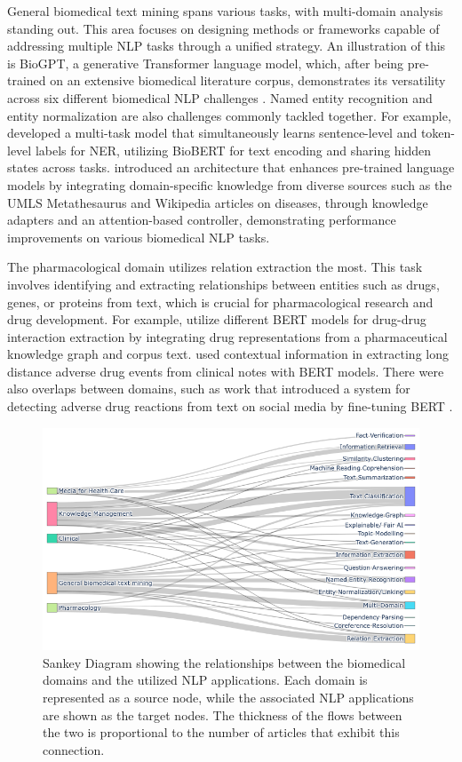 \documentclass[fleqn,10pt]{olplainarticle}
\begin{document}
General biomedical text mining spans various tasks, with multi-domain analysis standing out. This area focuses on designing methods or frameworks capable of addressing multiple NLP tasks through a unified strategy. An illustration of this is BioGPT, a generative Transformer language model, which, after being pre-trained on an extensive biomedical literature corpus, demonstrates its versatility across six different biomedical NLP challenges \citep{luo2022biogpt}. Named entity recognition and entity normalization are also challenges commonly tackled together. For example, \citep{tong2021multi} developed a multi-task model that simultaneously learns sentence-level and token-level labels for NER, utilizing BioBERT for text encoding and sharing hidden states across tasks. \cite{lu2021parameter} introduced an architecture that enhances pre-trained language models by integrating domain-specific knowledge from diverse sources such as the UMLS Metathesaurus and Wikipedia articles on diseases, through knowledge adapters and an attention-based controller, demonstrating performance improvements on various biomedical NLP tasks.

The pharmacological domain utilizes relation extraction the most. This task involves identifying and extracting relationships between entities such as drugs, genes, or proteins from text, which is crucial for pharmacological research and drug development. For example, \cite{asada2023integrating} utilize different BERT models for drug-drug interaction extraction by integrating drug representations from a pharmaceutical knowledge graph and corpus text. \cite{guan2019leveraging} used contextual information in extracting long distance adverse drug events from clinical notes with BERT models. There were also overlaps between domains, such as work that introduced a system for detecting adverse drug reactions from text on social media by fine-tuning BERT \citep{hussain2021pharmacovigilance}.

\begin{figure}[!ht]
\centering
\includegraphics[scale=0.45]{visuals/new_pdf/sankey_plot_domain_to_nlp.png}
\caption{Sankey Diagram showing the relationships between the biomedical domains and the utilized NLP applications. Each domain is represented as a source node, while the associated NLP applications are shown as the target nodes. The thickness of the flows between the two is proportional to the number of articles that exhibit this connection.}
\label{fig:sankey}
\end{figure}
\end{document}
